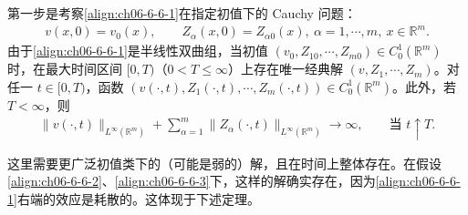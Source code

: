 \documentclass[../../main.tex]{subfiles}
\begin{document}
第一步是考察\eqref{align:ch06-6-6-1}在指定初值下的 Cauchy 问题：
\begin{align}
v(x,0)=v_{0}(x),\qquad Z_{\alpha}(x,0)=Z_{\alpha 0}(x),\ \alpha=1,\cdots,m,\ x\in\mathbb{R}^{m}.
\label{align:ch06-6-6-6}
\end{align}
由于\eqref{align:ch06-6-6-1}是半线性双曲组，当初值 $(v_{0},Z_{10},\cdots,Z_{m0})\in C_{0}^{1}(\mathbb{R}^{m})$ 时，在最大时间区间 $[0,T)$（$0<T\leqslant\infty$）上存在唯一经典解 $(v,Z_{1},\cdots,Z_{m})$。对任一 $t\in[0,T)$，函数 $(v(\cdot,t),Z_{1}(\cdot,t),\cdots,Z_{m}(\cdot,t))\in C_{0}^{1}(\mathbb{R}^{m})$。此外，若 $T<\infty$，则
\begin{align}
\|v(\cdot,t)\|_{L^{\infty}(\mathbb{R}^{m})}+\sum_{\alpha=1}^{m}\|Z_{\alpha}(\cdot,t)\|_{L^{\infty}(\mathbb{R}^{m})}\to\infty,\qquad\text{当 }t\uparrow T.
\label{align:ch06-6-6-7}
\end{align}

这里需要更广泛初值类下的（可能是弱的）解，且在时间上整体存在。在假设\eqref{align:ch06-6-6-2}、\eqref{align:ch06-6-6-3}下，这样的解确实存在，因为\eqref{align:ch06-6-6-1}右端的效应是耗散的。这体现于下述定理。
\end{document}
